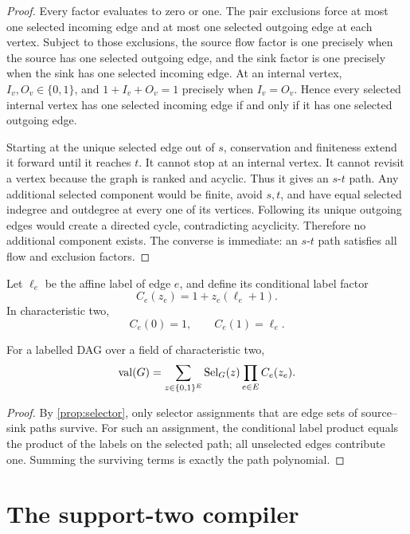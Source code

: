 \begin{proof}
Every factor evaluates to zero or one.  The pair exclusions force at most one selected
incoming edge and at most one selected outgoing edge at each vertex.  Subject to those
exclusions, the source flow factor is one precisely when the source has one selected
outgoing edge, and the sink factor is one precisely when the sink has one selected incoming
edge.  At an internal vertex, \(I_v,O_v\in\{0,1\}\), and
\(1+I_v+O_v=1\) precisely when \(I_v=O_v\).  Hence every selected internal vertex has one
selected incoming edge if and only if it has one selected outgoing edge.

Starting at the unique selected edge out of \(s\), conservation and finiteness extend it
forward until it reaches \(t\).  It cannot stop at an internal vertex.  It cannot revisit a
vertex because the graph is ranked and acyclic.  Thus it gives an \(s\)-\(t\) path.  Any
additional selected component would be finite, avoid \(s,t\), and have equal selected
indegree and outdegree at every one of its vertices.  Following its unique outgoing edges
would create a directed cycle, contradicting acyclicity.  Therefore no additional component
exists.  The converse is immediate: an \(s\)-\(t\) path satisfies all flow and exclusion
factors.
\end{proof}

Let \(\ell_e\) be the affine label of edge \(e\), and define its conditional label factor
\[
  C_e(z_e)=1+z_e(\ell_e+1).
\]
In characteristic two,
\[
  C_e(0)=1,
  \qquad
  C_e(1)=\ell_e.
\]

\begin{proposition}\label{prop:abp-cube}
For a labelled DAG over a field of characteristic two,
\[
  \operatorname{val}(G)=
  \sum_{z\in\{0,1\}^E}\operatorname{Sel}_G(z)\prod_{e\in E}C_e(z_e).
\]
\end{proposition}

\begin{proof}
By \cref{prop:selector}, only selector assignments that are edge sets of source--sink paths
survive.  For such an assignment, the conditional label product equals the product of the
labels on the selected path; all unselected edges contribute one.  Summing the surviving
terms is exactly the path polynomial.
\end{proof}

\section{The support-two compiler}\label{sec:compiler}

